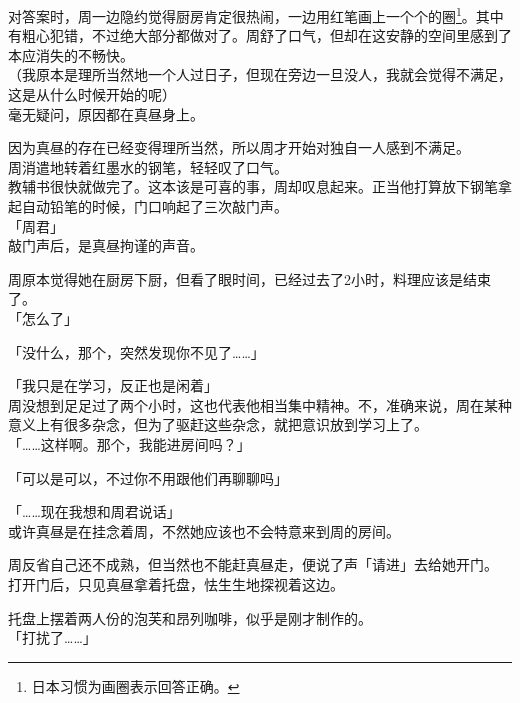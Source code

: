 对答案时，周一边隐约觉得厨房肯定很热闹，一边用红笔画上一个个的圈\footnote{日本习惯为画圈表示回答正确。}。其中有粗心犯错，不过绝大部分都做对了。周舒了口气，但却在这安静的空间里感到了本应消失的不畅快。\\

（我原本是理所当然地一个人过日子，但现在旁边一旦没人，我就会觉得不满足，这是从什么时候开始的呢）\\

毫无疑问，原因都在真昼身上。

因为真昼的存在已经变得理所当然，所以周才开始对独自一人感到不满足。\\

周消遣地转着红墨水的钢笔，轻轻叹了口气。\\

教辅书很快就做完了。这本该是可喜的事，周却叹息起来。正当他打算放下钢笔拿起自动铅笔的时候，门口响起了三次敲门声。\\

「周君」\\

敲门声后，是真昼拘谨的声音。

周原本觉得她在厨房下厨，但看了眼时间，已经过去了2小时，料理应该是结束了。\\

「怎么了」

「没什么，那个，突然发现你不见了……」

「我只是在学习，反正也是闲着」\\

周没想到足足过了两个小时，这也代表他相当集中精神。不，准确来说，周在某种意义上有很多杂念，但为了驱赶这些杂念，就把意识放到学习上了。\\

「……这样啊。那个，我能进房间吗？」

「可以是可以，不过你不用跟他们再聊聊吗」

「……现在我想和周君说话」\\

或许真昼是在挂念着周，不然她应该也不会特意来到周的房间。

周反省自己还不成熟，但当然也不能赶真昼走，便说了声「请进」去给她开门。\\

打开门后，只见真昼拿着托盘，怯生生地探视着这边。

托盘上摆着两人份的泡芙和昂列咖啡，似乎是刚才制作的。\\

「打扰了……」\\


